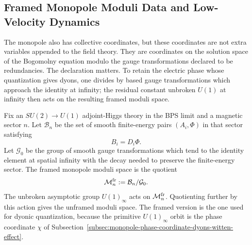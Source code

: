 \subsection{Framed Monopole Moduli Data and Low-Velocity Dynamics}
\label{subsec:framed-monopole-moduli-dynamics}

The monopole also has collective coordinates, but these coordinates are not
extra variables appended to the field theory.  They are coordinates on the
solution space of the Bogomolny equation modulo the gauge transformations
declared to be redundancies.  The declaration matters.  To retain the
electric phase whose quantization gives dyons, one divides by based gauge
transformations which approach the identity at infinity; the residual
constant unbroken \(U(1)\) at infinity then acts on the resulting framed
moduli space.

\begin{definition}
\label{def:framed-bps-monopole-moduli-datum}
Fix an \(SU(2)\to U(1)\) adjoint-Higgs theory in the BPS limit and a magnetic
sector \(n\).  Let \(\mathcal B_n\) be the set of smooth finite-energy pairs
\((A_i,\Phi)\) in that sector satisfying
\[
  B_i=D_i\Phi .
\]
Let \(\mathcal G_0\) be the group of smooth gauge transformations which tend
to the identity element at spatial infinity with the decay needed to preserve
the finite-energy sector.  The framed monopole moduli space is the quotient
\[
  \mathcal M_n^{\rm fr}:=\mathcal B_n/\mathcal G_0 .
\]
The unbroken asymptotic group \(U(1)_\infty\) acts on
\(\mathcal M_n^{\rm fr}\).  Quotienting further by this action gives the
unframed moduli space.  The framed version is the one used for dyonic
quantization, because the primitive \(U(1)_\infty\) orbit is the phase
coordinate \(\chi\) of Subsection~\ref{subsec:monopole-phase-coordinate-dyons-witten-effect}.
\end{definition}

